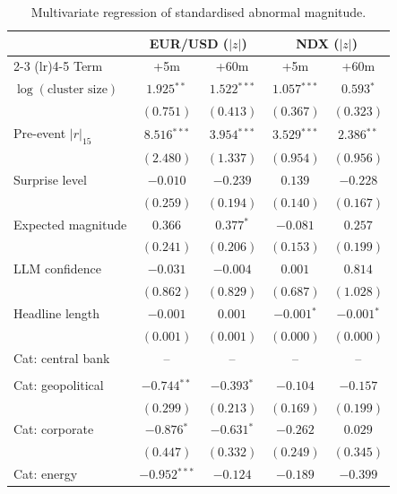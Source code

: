 \begin{table}[!htbp]
\centering
\caption{Multivariate regression of standardised abnormal magnitude.}
\label{tab:multivariate}
\begin{threeparttable}
\small
\begin{tabular}{lcccc}
\toprule
 & \multicolumn{2}{c}{EUR/USD ($|z|$)} & \multicolumn{2}{c}{NDX ($|z|$)} \\
\cmidrule(lr){2-3} \cmidrule(lr){4-5}
Term & +5m & +60m & +5m & +60m \\
\midrule
$\log(\text{cluster size})$ & $1.925$$^{**}$ & $1.522$$^{***}$ & $1.057$$^{***}$ & $0.593$$^{*}$ \\
 & $(0.751)$ & $(0.413)$ & $(0.367)$ & $(0.323)$ \\
\addlinespace[2pt]
Pre-event $|r|_{15}$ & $8.516$$^{***}$ & $3.954$$^{***}$ & $3.529$$^{***}$ & $2.386$$^{**}$ \\
 & $(2.480)$ & $(1.337)$ & $(0.954)$ & $(0.956)$ \\
\addlinespace[2pt]
Surprise level & $-0.010$ & $-0.239$ & $0.139$ & $-0.228$ \\
 & $(0.259)$ & $(0.194)$ & $(0.140)$ & $(0.167)$ \\
\addlinespace[2pt]
Expected magnitude & $0.366$ & $0.377$$^{*}$ & $-0.081$ & $0.257$ \\
 & $(0.241)$ & $(0.206)$ & $(0.153)$ & $(0.199)$ \\
\addlinespace[2pt]
LLM confidence & $-0.031$ & $-0.004$ & $0.001$ & $0.814$ \\
 & $(0.862)$ & $(0.829)$ & $(0.687)$ & $(1.028)$ \\
\addlinespace[2pt]
Headline length & $-0.001$ & $0.001$ & $-0.001$$^{*}$ & $-0.001$$^{*}$ \\
 & $(0.001)$ & $(0.001)$ & $(0.000)$ & $(0.000)$ \\
\addlinespace[2pt]
Cat: central bank & -- & -- & -- & -- \\
 &  &  &  &  \\
\addlinespace[2pt]
Cat: geopolitical & $-0.744$$^{**}$ & $-0.393$$^{*}$ & $-0.104$ & $-0.157$ \\
 & $(0.299)$ & $(0.213)$ & $(0.169)$ & $(0.199)$ \\
\addlinespace[2pt]
Cat: corporate & $-0.876$$^{*}$ & $-0.631$$^{*}$ & $-0.262$ & $0.029$ \\
 & $(0.447)$ & $(0.332)$ & $(0.249)$ & $(0.345)$ \\
\addlinespace[2pt]
Cat: energy & $-0.952$$^{***}$ & $-0.124$ & $-0.189$ & $-0.399$ \\

\end{tabular}
\end{threeparttable}
\end{table}
